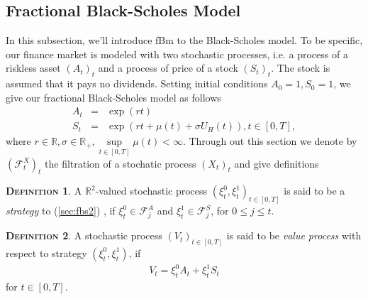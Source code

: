 \documentclass[a4paper, twoside, 11pt]{article}
\theoremstyle{definition}
\newtheorem{definition}{\scshape Definition}[section]
\begin{document}
\subsection{Fractional Black-Scholes Model}
In this subsection, we'll introduce fBm to the Black-Scholes model. To be specific, our finance market is modeled with two stochastic processes, i.e. a process of a riskless asset $(A_t)_t$ and a process of price of a stock $(S_t)_t$.  The stock is assumed that it pays no dividends. Setting initial conditions $A_0=1, S_0=1$, we give our fractional Black-Scholes model as follows
%
\begin{eqnarray}
  A_t &=& \exp(rt)\nonumber\\
  S_t &=& \exp(rt + \mu(t) +\sigma U_H(t)), t\in [0, T],
  \label{sec:fbs2}
\end{eqnarray}
where  $r\in\mathbb{R}, \sigma\in\mathbb{R}_+, \sup\limits_{t\in[0, T]}\mu(t) < \infty$.
 Through out this section we denote by $(\mathcal{F}^X_t)_t$ the filtration of a stochatic process $(X_t)_t$ and give definitions %

\begin{definition}
  A $\mathbb{R}^{2}$-valued stochastic process $(\xi_t^0, \xi_t^1)_{t\in [0, T]}$ is said to be a \emph{strategy} to (\ref{sec:fbs2}) , if $\xi_t^0 \in \mathcal{F}^A_{j}$ and $\xi_t^1 \in \mathcal{F}^S_j$, for $0\le j \le t$.
\end{definition}

\begin{definition}
  A stochastic process $(V_t)_{t\in[0, T]}$ is said to be \emph{value process} with respect to strategy $(\xi_t^0, \xi_t^1)$, if 
  \begin{eqnarray*}
	V_t =  \xi^0_t A_t + \xi^1_t S_t %
  \end{eqnarray*}
  for $t \in [0, T]$.
\end{definition}

\end{document}
